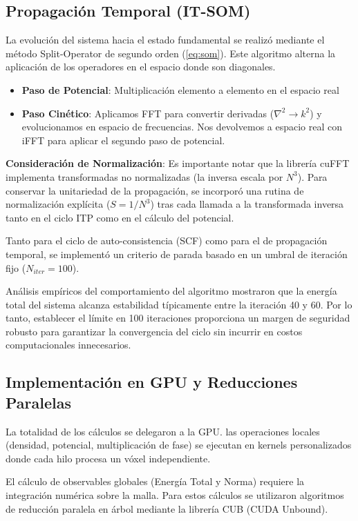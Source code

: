 \documentclass[aps,twocolumn,preprintnumbers]{revtex4}
\begin{document}
  \subsection{Propagación Temporal (IT-SOM)}

  La evolución del sistema hacia el estado fundamental se realizó mediante el método Split-Operator de segundo orden (\ref{eq:som}). Este algoritmo alterna la aplicación de los operadores en el espacio donde son diagonales.
  \begin{itemize}
    \item \textbf{Paso de Potencial}: Multiplicación elemento a elemento en el espacio real
    \item \textbf{Paso Cinético}: Aplicamos FFT para convertir derivadas ($\nabla^2 \to k^2$) y evolucionamos en espacio de frecuencias. Nos devolvemos a espacio real con iFFT para aplicar el segundo paso de potencial.
  \end{itemize}
  \textbf{Consideración de Normalización}: Es importante notar que la librería cuFFT implementa transformadas no normalizadas (la inversa escala por $N^3$). Para conservar la unitariedad de la propagación, se incorporó una rutina de normalización explícita ($S=1/N^3$) tras cada llamada a la transformada inversa tanto en el ciclo ITP como en el cálculo del potencial.

  Tanto para el ciclo de auto-consistencia (SCF) como para el de propagación temporal, se implementó un criterio de parada basado en un umbral de iteración fijo ($N_{iter}=100$).

  Análisis empíricos del comportamiento del algoritmo mostraron que la energía total del sistema alcanza estabilidad típicamente entre la iteración 40 y 60. Por lo tanto, establecer el límite en 100 iteraciones proporciona un margen de seguridad robusto para garantizar la convergencia del ciclo sin incurrir en costos computacionales innecesarios.

  \subsection{Implementación en GPU y Reducciones Paralelas}

  La totalidad de los cálculos se delegaron a la GPU. las operaciones locales (densidad, potencial, multiplicación de fase) se ejecutan en kernels personalizados donde cada hilo procesa un vóxel independiente.

  El cálculo de observables globales (Energía Total y Norma) requiere la integración numérica sobre la malla. Para estos cálculos se utilizaron algoritmos de reducción paralela en árbol mediante la librería CUB (CUDA Unbound).
\end{document}
